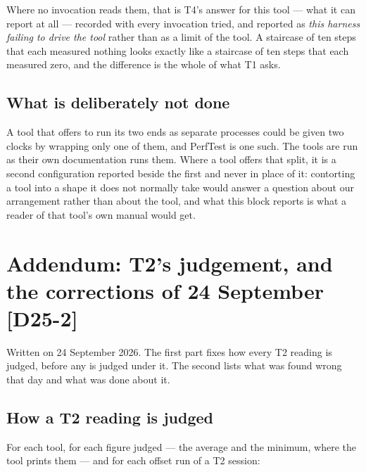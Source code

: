 \documentclass[11pt]{article}
\newcommand{\chgold}[1]{\,{\color{oldcol}\bfseries\footnotesize[#1]}}
\begin{document}
Where no invocation reads them, that is T4's answer for this tool --- what it can report at all
--- recorded with every invocation tried, and reported as \emph{this harness failing to drive the
tool} rather than as a limit of the tool. A staircase of ten steps that each measured nothing
looks exactly like a staircase of ten steps that each measured zero, and the difference is the
whole of what T1 asks.

\subsection*{What is deliberately not done}
A tool that offers to run its two ends as separate processes could be given two clocks by wrapping
only one of them, and PerfTest is one such. The tools are run as their own documentation runs
them. Where a tool offers that split, it is a second configuration reported beside the first and
never in place of it: contorting a tool into a shape it does not normally take would answer a
question about our arrangement rather than about the tool, and what this block reports is what a
reader of that tool's own manual would get.

\section[Addendum: T2's judgement, and the corrections of 24 September]{Addendum: T2's judgement, and the corrections of 24 September\protect\chgold{D25-2}}\label{sec:addendum-t2}
Written on 24 September 2026. The first part fixes how every T2 reading is judged, before any is
judged under it. The second lists what was found wrong that day and what was done about it.

\subsection*{How a T2 reading is judged}
For each tool, for each figure judged --- the average and the minimum, where the tool prints
them --- and for each offset run of a T2 session:
\end{document}
